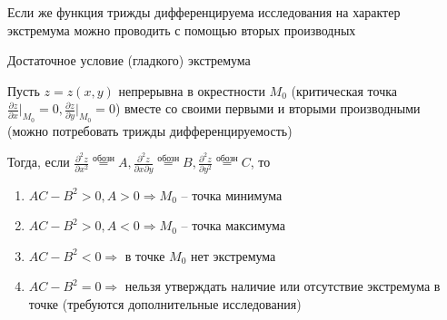\documentclass[12pt]{article}
\begin{document}
    Если же функция трижды дифференцируема исследования на характер экстремума можно проводить с помощью вторых производных

    \hypertarget{extremumsufficientcondition}{}

    \begin{MyTheorem}
        \Ths Достаточное условие (гладкого) экстремума

        Пусть $z = z(x, y)$ непрерывна в окрестности $M_0$ (критическая точка $\frac{\partial z}{\partial x} \Big|_{M_0} = 0, \frac{\partial z}{\partial y} \Big|_{M_0} = 0$)
        вместе со своими первыми и вторыми производными (можно потребовать трижды дифференцируемость)

        Тогда, если $\frac{\partial^2 z}{\partial x^2} \stackrel{\text{обозн}}{=} A, \frac{\partial^2 z}{\partial x \partial y} \stackrel{\text{обозн}}{=} B, \frac{\partial^2 z}{\partial y^2} \stackrel{\text{обозн}}{=} C$, то

        \begin{enumerate}
            \item $AC - B^2 > 0, A > 0 \Longrightarrow M_0$ -- точка минимума
            \item $AC - B^2 > 0, A < 0 \Longrightarrow M_0$ -- точка максимума
            \item $AC - B^2 < 0 \Longrightarrow$ в точке $M_0$ нет экстремума
            \item $AC - B^2 = 0\Longrightarrow$ нельзя утверждать наличие или отсутствие экстремума в точке (требуются дополнительные исследования)
        \end{enumerate}
    \end{MyTheorem}
\end{document}
